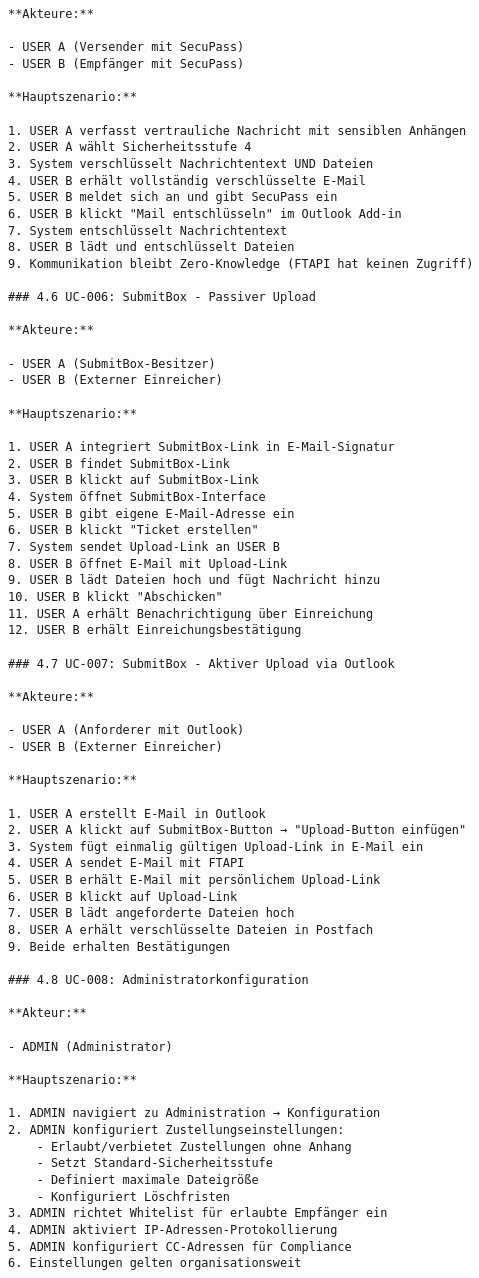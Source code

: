 \begin{Verbatim}[breaklines=true]
**Akteure:**

- USER A (Versender mit SecuPass)
- USER B (Empfänger mit SecuPass)

**Hauptszenario:**

1. USER A verfasst vertrauliche Nachricht mit sensiblen Anhängen
2. USER A wählt Sicherheitsstufe 4
3. System verschlüsselt Nachrichtentext UND Dateien
4. USER B erhält vollständig verschlüsselte E-Mail
5. USER B meldet sich an und gibt SecuPass ein
6. USER B klickt "Mail entschlüsseln" im Outlook Add-in
7. System entschlüsselt Nachrichtentext
8. USER B lädt und entschlüsselt Dateien
9. Kommunikation bleibt Zero-Knowledge (FTAPI hat keinen Zugriff)

### 4.6 UC-006: SubmitBox - Passiver Upload

**Akteure:**

- USER A (SubmitBox-Besitzer)
- USER B (Externer Einreicher)

**Hauptszenario:**

1. USER A integriert SubmitBox-Link in E-Mail-Signatur
2. USER B findet SubmitBox-Link
3. USER B klickt auf SubmitBox-Link
4. System öffnet SubmitBox-Interface
5. USER B gibt eigene E-Mail-Adresse ein
6. USER B klickt "Ticket erstellen"
7. System sendet Upload-Link an USER B
8. USER B öffnet E-Mail mit Upload-Link
9. USER B lädt Dateien hoch und fügt Nachricht hinzu
10. USER B klickt "Abschicken"
11. USER A erhält Benachrichtigung über Einreichung
12. USER B erhält Einreichungsbestätigung

### 4.7 UC-007: SubmitBox - Aktiver Upload via Outlook

**Akteure:**

- USER A (Anforderer mit Outlook)
- USER B (Externer Einreicher)

**Hauptszenario:**

1. USER A erstellt E-Mail in Outlook
2. USER A klickt auf SubmitBox-Button → "Upload-Button einfügen"
3. System fügt einmalig gültigen Upload-Link in E-Mail ein
4. USER A sendet E-Mail mit FTAPI
5. USER B erhält E-Mail mit persönlichem Upload-Link
6. USER B klickt auf Upload-Link
7. USER B lädt angeforderte Dateien hoch
8. USER A erhält verschlüsselte Dateien in Postfach
9. Beide erhalten Bestätigungen

### 4.8 UC-008: Administratorkonfiguration

**Akteur:**

- ADMIN (Administrator)

**Hauptszenario:**

1. ADMIN navigiert zu Administration → Konfiguration
2. ADMIN konfiguriert Zustellungseinstellungen:
    - Erlaubt/verbietet Zustellungen ohne Anhang
    - Setzt Standard-Sicherheitsstufe
    - Definiert maximale Dateigröße
    - Konfiguriert Löschfristen
3. ADMIN richtet Whitelist für erlaubte Empfänger ein
4. ADMIN aktiviert IP-Adressen-Protokollierung
5. ADMIN konfiguriert CC-Adressen für Compliance
6. Einstellungen gelten organisationsweit


\end{Verbatim}
